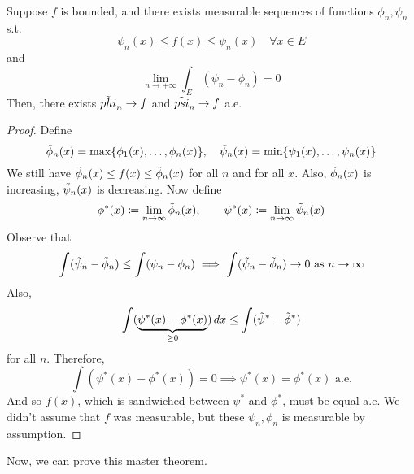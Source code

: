   \begin{lemma} 
    Suppose $f$ is bounded, and there exists measurable sequences of functions $\phi_n, \psi_n$ s.t. 
    \begin{equation}
      \psi_n (x) \leq f(x) \leq \psi_n(x) \quad \forall x \in E
    \end{equation}
    and 
    \begin{equation}
      \lim_{n \to +\infty} \int_E (\psi_n - \phi_n) = 0
    \end{equation}
    Then, there exists $\Tilde{phi}_n \to f$ and $\Tilde{psi}_n \to f$ a.e. 
  \end{lemma}
  \begin{proof}
    Define 
    \begin{equation}
      \Tilde{\phi}_n (x) = \max\{\phi_1 (x) , \ldots, \phi_n (x) \}, \quad \Tilde{\psi}_n (x) = \min\{\psi_1 (x) , \ldots, \psi_n (x) \}
    \end{equation}
    We still have $\Tilde{\phi}_n (x) \leq f(x) \leq \Tilde{\phi}_n (x)$ for all $n$ and for all $x$. Also, $\Tilde{\phi}_n (x)$ is increasing, $\Tilde{\psi}_n (x)$ is decreasing. Now define 
    \begin{equation}
      \phi^\ast (x) \coloneqq \lim_{n \to \infty} \Tilde{\phi}_n (x), \qquad \psi^\ast (x) \coloneqq \lim_{n \to \infty} \Tilde{\psi}_n (x)
    \end{equation}
    Observe that 
    \begin{equation}
      \int (\Tilde{\psi}_n - \Tilde{\phi}_n) \leq \int (\psi_n - \phi_n) \implies \int (\Tilde{\psi}_n - \Tilde{\phi}_n) \to 0 \text{ as } n \to \infty 
    \end{equation}
    Also, 
    \begin{equation}
      \int (\underbrace{\psi^\ast (x) - \phi^\ast(x)}_{\geq 0}) \,dx \leq \int (\Tilde{\psi}^\ast - \Tilde{\phi}^\ast) 
    \end{equation}
    for all $n$. Therefore, 
    \begin{equation}
      \int (\psi^\ast (x) - \phi^\ast (x)) = 0 \implies \psi^\ast (x) = \phi^\ast (x) \text{ a.e.}
    \end{equation}
    And so $f(x)$, which is sandwiched between $\psi^\ast$ and $\phi^\ast$, must be equal a.e. We didn't assume that $f$ was measurable, but these $\psi_n, \phi_n$ is measurable by assumption. 
  \end{proof}

  Now, we can prove this master theorem. 

